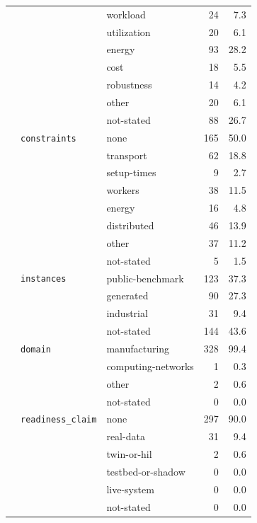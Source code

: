 \begin{longtable}{lllr@{\hspace{1.0em}}r}
 &  & workload & 24 & 7.3 \\
 &  & utilization & 20 & 6.1 \\
 &  & energy & 93 & 28.2 \\
 &  & cost & 18 & 5.5 \\
 &  & robustness & 14 & 4.2 \\
 &  & other & 20 & 6.1 \\
 &  & not-stated & 88 & 26.7 \\
 & \texttt{constraints} & none & 165 & 50.0 \\
 &  & transport & 62 & 18.8 \\
 &  & setup-times & 9 & 2.7 \\
 &  & workers & 38 & 11.5 \\
 &  & energy & 16 & 4.8 \\
 &  & distributed & 46 & 13.9 \\
 &  & other & 37 & 11.2 \\
 &  & not-stated & 5 & 1.5 \\
 & \texttt{instances} & public-benchmark & 123 & 37.3 \\
 &  & generated & 90 & 27.3 \\
 &  & industrial & 31 & 9.4 \\
 &  & not-stated & 144 & 43.6 \\
 & \texttt{domain} & manufacturing & 328 & 99.4 \\
 &  & computing-networks & 1 & 0.3 \\
 &  & other & 2 & 0.6 \\
 &  & not-stated & 0 & 0.0 \\
 & \texttt{readiness\_claim} & none & 297 & 90.0 \\
 &  & real-data & 31 & 9.4 \\
 &  & twin-or-hil & 2 & 0.6 \\
 &  & testbed-or-shadow & 0 & 0.0 \\
 &  & live-system & 0 & 0.0 \\
 &  & not-stated & 0 & 0.0 \\
\bottomrule
\end{longtable}
